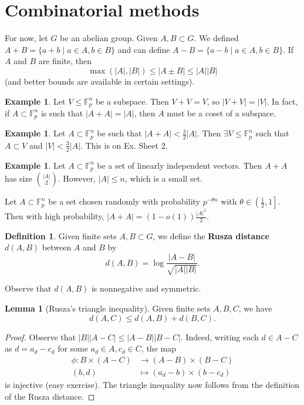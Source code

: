 \documentclass{article}
\theoremstyle{definition}
\newtheorem{lemma}[theorem]{Lemma}
\newtheorem{example}[theorem]{Example}
\newtheorem{defn}[theorem]{Definition}
\begin{document}
\section{Combinatorial methods}
For now, let $G$ be an abelian group. Given $A,B \subset G$. We defined $A+B = \{a + b \mid a \in A, b \in B\}$ and can define $A - B = \{a-b \mid a \in A, b \in B\}$. If $A$ and $B$ are finite, then $$\max(\left|A \right|,\left|B \right|)\le \left|A\pm B \right| \le \left|A \right|\left|B \right|$$
(and better bounds are available in certain settings).
\begin{example}
    Let $V\le \mathbb{F}_p^n$ be a subspace. Then $V+V=V$, so $\left|V+V \right| = \left|V \right|$. In fact, if $A \subset \mathbb{F}_p^n$ is such that $\left|A+A \right|=\left|A \right|$, then $A$ must be a coset of a subspace.
\end{example}
\begin{example}
    Let $A \subset \mathbb{F}_p^n$ be such that $\left|A+A \right|<\frac{3}{2}\left|A \right|$. Then $\exists V \le \mathbb{F}_p^n$ such that $A \subset V$ and $\left|V\right|<\frac{3}{2}\left|A\right|$. This is on Ex. Sheet 2.
\end{example}
\begin{example}
    Let $A \subset \mathbb{F}_p^n$ be a set of linearly independent vectors. Then $A+A$ has size ${\left|A\right|\choose 2}$. However, $\left|A\right|\le n$, which is a small set.
    \vspace{1mm}
     
    Let $A \subset \mathbb{F}_p^n$ be a set chosen randomly with probability $p^{-\theta n}$ with $\theta \in \left(\frac{1}{2},1\right]$. Then with high probability, $\left|A+A\right| = (1-o(1))\frac{\left|A\right|^2}{2}$.
\end{example}
\begin{defn}
    Given finite sets $A,B \subset G$, we define the \textbf{Rusza distance} $d(A,B)$ between $A$ and $B$ by $$d(A,B) = \log \frac{\left|A-B\right|}{\sqrt{\left|A\right|\left|B\right|}}.$$
\end{defn}
Observe that $d(A,B)$ is nonnegative and symmetric.
\begin{lemma}[Rusza's triangle inequality]\label{lemma2.5}
    Given finite sets $A,B,C$, we have \[
    d(A,C) \le d(A,B) + d(B,C).
    \]
\end{lemma}
\begin{proof}
    Observe that $\left|B\right|\left|A-C\right| \le \left|A-B\right|\left|B-C\right|$. Indeed, writing each $d \in A-C$ as $d = a_d-c_d$ for some $a_d \in A, c_d \in C$, the map \begin{align*}
        \phi: B \times (A-C) &\to (A-B)\times(B-C)\\
        (b,d) &\mapsto (a_d-b)\times(b-c_d)
    \end{align*}
    is injective (easy exercise). The triangle inequality now follows from the definition of the Rusza distance. 
\end{proof}
\end{document}
